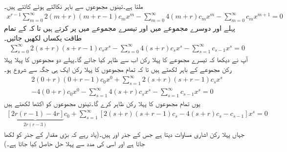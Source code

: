 ملتا ہے۔تینوں مجموعوں سے  باہر نکالتے ہوئے کاٹتے ہیں۔
\begin{align*}
x^{r-1}\sum_{m=0}^{\infty}2 (m+r)(m+r-1)c_mx^{m}-\sum_{m=0}^{\infty}4(m+r)c_mx^{m}-\sum_{m=0}^{\infty}c_mx^{m+1}=0
\end{align*}
پہلے اور دوسرے مجموعے میں  اور تیسرے مجموعے میں  پر کرتے ہیں تا کہ  کے تمام طاقت یکساں لکھیں جائیں۔
\begin{align*}
\sum_{s=0}^{\infty}2 (s+r)(s+r-1)c_sx^{s}-\sum_{s=0}^{\infty}4(s+r)c_sx^{s}-\sum_{s=1}^{\infty}c_{s-1}x^{s}=0
\end{align*}
آپ نے دیکھا کہ تیسرے مجموعے کا پہلا رکن اب  سے ظاہر کیا جائے گا۔پہلے دو مجموعوں کا پہلا پہلا رکن مجموعے کے باہر لکھتے ہیں تا کہ تمام مجموعوں کا پہلا رکن ایک ہی جگہ سے شروع ہو۔ 
\begin{multline*}
2(0+r)(0+r-1)c_0x^0+\sum_{s=1}^{\infty}2 (s+r)(s+r-1)c_sx^{s}\\
-4(0+r)c_0x^0-\sum_{s=1}^{\infty}4(s+r)c_sx^{s}-\sum_{s=1}^{\infty}c_{s-1}x^{s}=0
\end{multline*}
یوں تمام مجموعوں کا پہلا رکن  ظاہر کرے گا۔تینوں مجموعوں کو اکٹھا لکھتے ہیں
\begin{multline}\label{مساوات_بیسل_اشاری_عمومی_الف}
\underbrace{[2r(r-1)-4r]}_{2r(r-3)}c_0+\sum_{s=1}^{\infty}[2 (s+r)(s+r-1)c_s-4(s+r)c_s-c_{s-1}]x^{s}=0
\end{multline}
جہاں پہلا رکن  اشاری مساوات  دیتا ہے جس کے جذر  اور  ہیں۔(یاد رہے کہ بڑی مقدار کے جذر کو  لکھا جاتا ہے اور اسی کی مدد سے پہلا حل حاصل کیا جاتا ہے۔)

